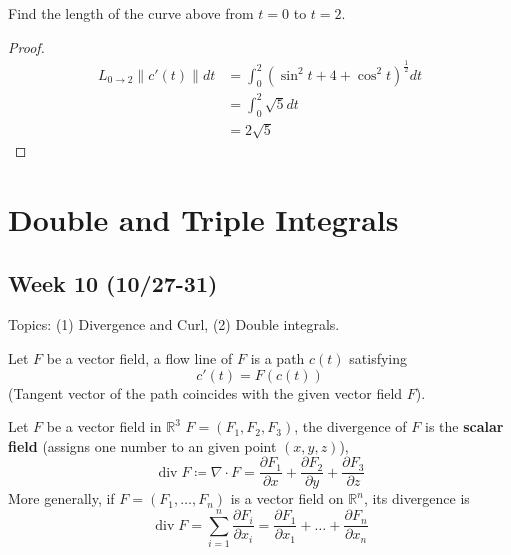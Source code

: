 \documentclass[openany]{book}
\newcommand{\R}{\mathbb{R}}
\newcommand{\diverg}{\operatorname{div}}
\begin{document}
\begin{prob}
    Find the length of the curve above from $t=0$ to $t=2$.
\end{prob}
\begin{proof}
    \begin{align*}
        L_{0\to 2}\|c'(t)\|dt&=\int_0^2\left(\sin^2t+4+\cos^2t\right)^\frac{1}{2}dt\\
        &=\int_0^2\sqrt{5}dt\\
        &=2\sqrt{5}
    \end{align*}
\end{proof}


\newpage 

\chapter{Double and Triple Integrals}

\section*{\centering Week 10 (10/27-31)}



\noindent
Topics: (1) Divergence and Curl, (2) Double integrals.



\begin{defn}
    Let ${F}$ be a vector field, a flow line of $F$ is a path $c(t)$ satisfying 
    \begin{equation*}
        c'(t)=F(c(t))
    \end{equation*}
    (Tangent vector of the path coincides with the given vector field ${F}$).
\end{defn}

\begin{defn}[divergence]
    Let ${F}$ be a vector field in $\R^3$ $F=(F_1,F_2,F_3)$, the divergence of ${F}$ is the \textbf{scalar field} (assigns one number to an given point $(x, y, z)$), 
    \begin{equation*}
        \diverg F\coloneq\nabla\cdot F=\frac{\partial F_1}{\partial x}+\frac{\partial F_2}{\partial y}+\frac{\partial F_3}{\partial z}
    \end{equation*}
    More generally, if $F=(F_1,\dots, F_n)$ is a vector field on $\R^n$, its divergence is 
    \begin{equation*}
        \diverg F=\sum_{i=1}^n\frac{\partial F_i}{\partial x_i}=\frac{\partial F_1}{\partial x_1}+\dots+\frac{\partial F_n}{\partial x_n}
    \end{equation*}
\end{defn}
\end{document}
